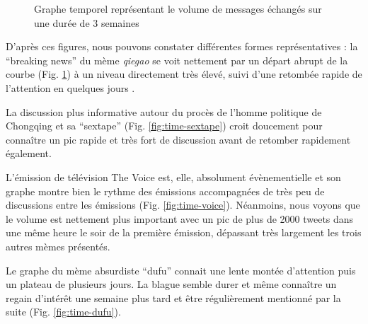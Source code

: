 \begin{figure}[ht]
{      \label{fig:time-qiegao}
    }
    \newline
    \caption{
      Graphe temporel repr\'esentant le volume de messages \'echang\'es sur une dur\'ee de 3 semaines    
    }
\end{figure}
\clearpage

D{\textquoteright}apr\`es ces figures, nous pouvons constater
diff\'erentes formes repr\'esentatives : la {\textquotedblleft}breaking
news{\textquotedblright} du m\`eme \textit{qiegao} se voit nettement
par un d\'epart abrupt de la courbe (Fig. \ref{fig:time-qiegao}) \`a un niveau
directement tr\`es \'elev\'e, suivi d{\textquoteright}une retomb\'ee
rapide de l{\textquoteright}attention en quelques jours . 

La discussion plus informative autour du proc\`es de
l{\textquoteright}homme politique de Chongqing et sa
{\textquotedblleft}sextape{\textquotedblright} (Fig. \ref{fig:time-sextape}) croit
doucement pour conna\^itre un pic rapide et tr\`es fort de discussion
avant de retomber rapidement \'egalement. 

L{\textquoteright}\'emission de t\'el\'evision The Voice est, elle,
absolument \'ev\`enementielle et son graphe montre bien le rythme des
\'emissions accompagn\'ees de tr\`es peu de discussions entre les
\'emissions (Fig. \ref{fig:time-voice}). N\'eanmoins, nous voyons que le volume est
nettement plus important avec un pic de plus de 2000 tweets dans une
m\^eme heure le soir de la premi\`ere \'emission, d\'epassant tr\`es
largement les trois autres m\`emes pr\'esent\'es. 

Le graphe du m\`eme absurdiste
{\textquotedblleft}dufu{\textquotedblright} connait une lente mont\'ee
d{\textquoteright}attention puis un plateau de plusieurs jours. La
blague semble durer et m\^eme conna\^itre un regain
d{\textquoteright}int\'er\^et une semaine plus tard et \^etre
r\'eguli\`erement mentionn\'e par la suite (Fig. \ref{fig:time-dufu}). 


